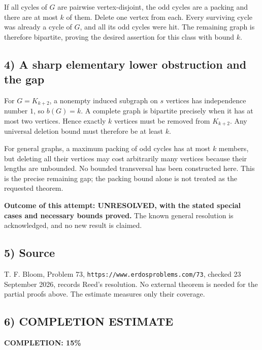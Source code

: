 If all cycles of $G$ are pairwise vertex-disjoint, the odd cycles
are a packing and there are at most $k$ of them. Delete one vertex
from each. Every surviving cycle was already a cycle of $G$, and
all its odd cycles were hit. The remaining graph is therefore
bipartite, proving the desired assertion for this class with bound $k$.

\subsection{4) A sharp elementary lower obstruction and the gap}
For $G=K_{k+2}$, a nonempty induced subgraph on $s$ vertices has
independence number $1$, so $b(G)=k$. A complete graph is bipartite
precisely when it has at most two vertices. Hence exactly $k$
vertices must be removed from $K_{k+2}$. Any universal deletion
bound must therefore be at least $k$.

For general graphs, a maximum packing of odd cycles has at most
$k$ members, but deleting all their vertices may cost arbitrarily
many vertices because their lengths are unbounded. No bounded
transversal has been constructed here. This is the precise remaining
gap; the packing bound alone is not treated as the requested theorem.

\textbf{Outcome of this attempt: UNRESOLVED, with the stated special
cases and necessary bounds proved.} The known general resolution
is acknowledged, and no new result is claimed.

\subsection{5) Source}
T. F. Bloom, Problem 73,
\texttt{https://www.erdosproblems.com/73}, checked 23 September 2026,
records Reed's resolution. No external theorem is needed for the
partial proofs above. The estimate measures only their coverage.
\subsection{6) COMPLETION ESTIMATE}
\textbf{COMPLETION: 15\%}
